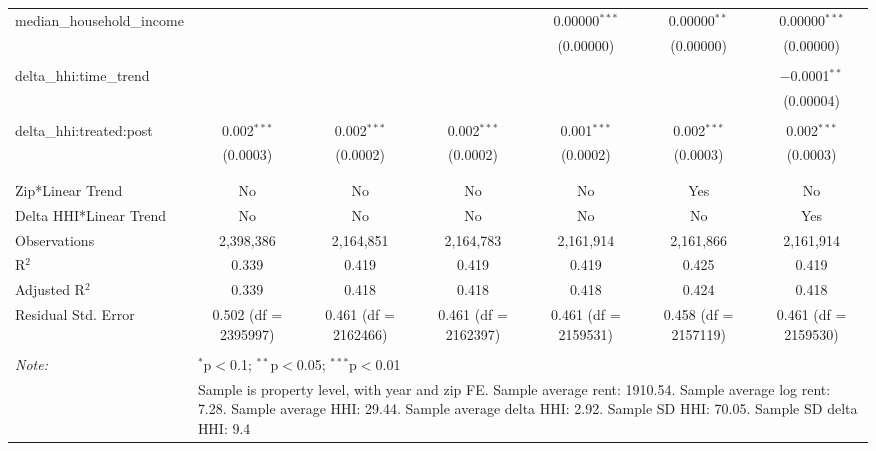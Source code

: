 \begin{table}[H]
{\begin{tabular}{@{\extracolsep{5pt}}lcccccc}
  median\_household\_income &  &  &  & 0.00000$^{***}$ & 0.00000$^{**}$ & 0.00000$^{***}$ \\  

   &  &  &  & (0.00000) & (0.00000) & (0.00000) \\  

   & & & & & & \\  

  delta\_hhi:time\_trend &  &  &  &  &  & $-$0.0001$^{**}$ \\  

   &  &  &  &  &  & (0.00004) \\  

   & & & & & & \\  

  delta\_hhi:treated:post & 0.002$^{***}$ & 0.002$^{***}$ & 0.002$^{***}$ & 0.001$^{***}$ & 0.002$^{***}$ & 0.002$^{***}$ \\  

   & (0.0003) & (0.0002) & (0.0002) & (0.0002) & (0.0003) & (0.0003) \\  

   & & & & & & \\  

 \hline \\[-1.8ex]  

 Zip*Linear Trend & No & No & No & No & Yes & No \\  

 Delta HHI*Linear Trend & No & No & No & No & No & Yes \\  

 Observations & 2,398,386 & 2,164,851 & 2,164,783 & 2,161,914 & 2,161,866 & 2,161,914 \\  

 R$^{2}$ & 0.339 & 0.419 & 0.419 & 0.419 & 0.425 & 0.419 \\  

 Adjusted R$^{2}$ & 0.339 & 0.418 & 0.418 & 0.418 & 0.424 & 0.418 \\  

 Residual Std. Error & 0.502 (df = 2395997) & 0.461 (df = 2162466) & 0.461 (df = 2162397) & 0.461 (df = 2159531) & 0.458 (df = 2157119) & 0.461 (df = 2159530) \\  

 \hline  

 \hline \\[-1.8ex]  

 \textit{Note:}  & \multicolumn{6}{l}{$^{*}$p$<$0.1; $^{**}$p$<$0.05; $^{***}$p$<$0.01} \\  

  & \multicolumn{6}{l}{Sample is property level, with year and zip FE. Sample average rent: 1910.54. Sample average log rent: 7.28. Sample average HHI: 29.44. Sample average delta HHI: 2.92. Sample SD HHI: 70.05. Sample SD delta HHI: 9.4} \\  

 \end{tabular}}  

 \end{table}  

